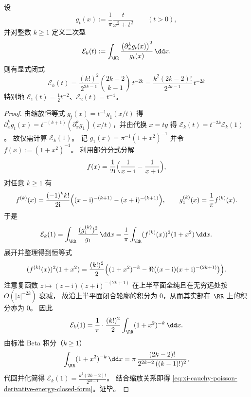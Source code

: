 \begin{proposition}\label{prop:xi-cauchy-poisson-derivative-energy-closed-form}
设
\[
g_t(x):=\frac{1}{\pi}\frac{t}{x^2+t^2}\qquad(t>0),
\]
并对整数 \(k\ge 1\) 定义二次型
\[
\mathcal{E}_k(t):=\int_{\RR}\frac{\bigl(\partial_x^{k}g_t(x)\bigr)^2}{g_t(x)}\,\dd x.
\]
则有显式闭式
\begin{equation}\label{eq:xi-cauchy-poisson-derivative-energy-closed-form}
\boxed{\;
\mathcal{E}_k(t)=\frac{(k!)^2}{2^{2k-1}}\binom{2k-2}{k-1}\,t^{-2k}
=\frac{k^2(2k-2)!}{2^{2k-1}}\,t^{-2k}\;}
\end{equation}
特别地 \(\mathcal{E}_1(t)=\tfrac12 t^{-2}\)、\(\mathcal{E}_2(t)=t^{-4}\)。
\end{proposition}

\begin{proof}
由缩放恒等式 \(g_t(x)=t^{-1}g_1(x/t)\) 得
\(
\partial_x^k g_t(x)=t^{-(k+1)}(\partial_x^k g_1)(x/t)
\)，并由代换 \(x=ty\) 得
\(
\mathcal{E}_k(t)=t^{-2k}\mathcal{E}_k(1)
\)。
故仅需计算 \(\mathcal{E}_k(1)\)。
记 \(g_1(x)=\pi^{-1}(1+x^2)^{-1}\) 并令 \(f(x):=(1+x^2)^{-1}\)。
利用部分分式分解
\[
f(x)=\frac{1}{2\mathrm{i}}\Bigl(\frac{1}{x-\mathrm{i}}-\frac{1}{x+\mathrm{i}}\Bigr),
\]
对任意 \(k\ge 1\) 有
\[
f^{(k)}(x)=\frac{(-1)^k k!}{2\mathrm{i}}\Bigl((x-\mathrm{i})^{-(k+1)}-(x+\mathrm{i})^{-(k+1)}\Bigr),
\qquad
g_1^{(k)}(x)=\frac{1}{\pi}f^{(k)}(x).
\]
于是
\[
\mathcal{E}_k(1)
=\int_{\RR}\frac{(g_1^{(k)})^2}{g_1}\,\dd x
=\frac{1}{\pi}\int_{\RR}(f^{(k)}(x))^2(1+x^2)\,\dd x.
\]
展开并整理得到恒等式
\[
(f^{(k)}(x))^2(1+x^2)
=\frac{(k!)^2}{2}\Bigl((1+x^2)^{-k}-\Re\bigl((x-\mathrm{i})(x+\mathrm{i})^{-(2k+1)}\bigr)\Bigr).
\]
注意复函数 \(z\mapsto (z-\mathrm{i})(z+\mathrm{i})^{-(2k+1)}\) 在上半平面全纯且在无穷远处按 \(O(|z|^{-2k})\) 衰减，
故沿上半平面闭合轮廓的积分为 \(0\)，从而其实部在 \(\RR\) 上的积分亦为 \(0\)。
因此
\[
\mathcal{E}_k(1)=\frac{1}{\pi}\cdot\frac{(k!)^2}{2}\int_{\RR}(1+x^2)^{-k}\,\dd x.
\]
由标准 Beta 积分（\(k\ge 1\)）
\[
\int_{\RR}(1+x^2)^{-k}\,\dd x
=\pi\,\frac{(2k-2)!}{2^{2k-2}\,((k-1)!)^2},
\]
代回并化简得
\(
\mathcal{E}_k(1)=\frac{k^2(2k-2)!}{2^{2k-1}}
\)。
结合缩放关系即得 \eqref{eq:xi-cauchy-poisson-derivative-energy-closed-form}。证毕。
\end{proof}

